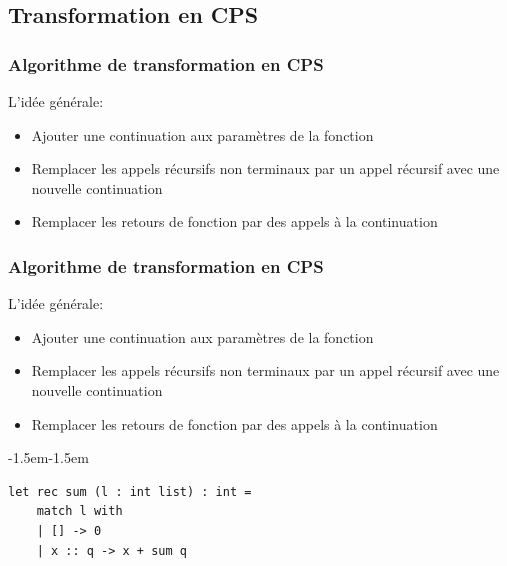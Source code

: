 \subsection{Transformation en CPS}

\begin{frame}[fragile,t]
    \frametitle{Algorithme de transformation en CPS}

    L'idée générale:
    \begin{itemize}
        \item Ajouter une continuation aux paramètres de la fonction
        \item Remplacer les appels récursifs non terminaux par un appel récursif
              avec une nouvelle continuation
        \item Remplacer les retours de fonction par des appels à la continuation
    \end{itemize}
\end{frame}

\addtocounter{framenumber}{-1}
\begin{frame}[fragile,t]
    \frametitle{Algorithme de transformation en CPS}

    L'idée générale:
    \begin{itemize}
        \item[\textcolor{orange}{$\blacktriangleright$}] Ajouter une continuation aux paramètres de la fonction
        \item Remplacer les appels récursifs non terminaux par un appel récursif
              avec une nouvelle continuation
        \item Remplacer les retours de fonction par des appels à la continuation
    \end{itemize}

    \vspace{0.1cm}

    \begin{adjustwidth}{-1.5em}{-1.5em}
        \begin{verbatim}
let rec sum (l : int list) : int =
    match l with
    | [] -> 0
    | x :: q -> x + sum q
        \end{verbatim}
    \end{adjustwidth}
\end{frame}

